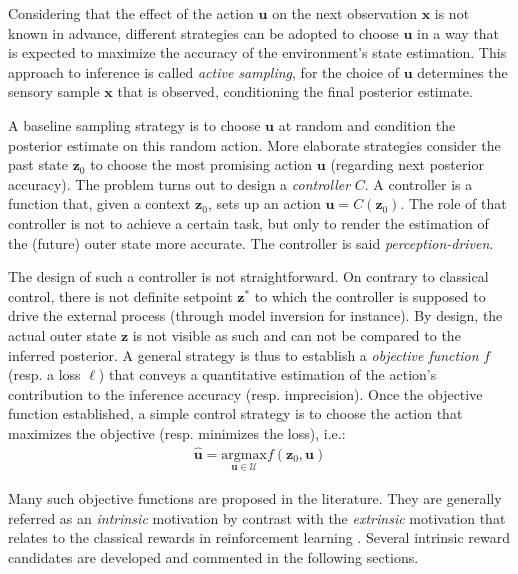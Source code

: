 \documentclass[12pt,twoside,openright]{article}
\begin{document}
Considering that the effect of the action $\boldsymbol{u}$ on the next observation $\boldsymbol{x}$ is not known in advance, different strategies can be adopted to choose $\boldsymbol{u}$ in a way that is expected to maximize the accuracy of the environment's state estimation. This approach to inference is called \emph{active sampling}, for the choice of $\boldsymbol{u}$ determines the sensory sample $\boldsymbol{x}$ that is observed, conditioning the final posterior estimate.

A baseline sampling strategy is to choose $\boldsymbol{u}$ at random and condition the posterior  estimate on this random action. 
More elaborate strategies consider the past state $\boldsymbol{z}_0$ to choose the most promising action $\boldsymbol{u}$ (regarding next posterior accuracy). The problem turns out to design  a \emph{controller} $C$. A controller is a function that, given a context $\boldsymbol{z}_0$, sets up an action $\boldsymbol{u} = C(\boldsymbol{z}_0)$. The role of that controller is not to achieve a certain task, but only to render the estimation of the (future) outer state more accurate. The controller is said \emph{perception-driven}. 

The design of such a controller is not straightforward. On contrary to classical control, there is not definite setpoint $\boldsymbol{z}^*$ to which the controller is supposed to drive the external process (through model inversion for instance). By design, the actual outer state $\boldsymbol{z}$ is not visible as such and can not be compared to the inferred posterior. A general strategy is thus to establish a \emph{objective function} $f$ (resp. a loss $\ell$) that conveys a quantitative estimation of the action's contribution to the inference accuracy (resp. imprecision). Once the objective function established, a simple control strategy is to choose the action that maximizes the objective (resp. minimizes the loss), i.e.:
\begin{align}
\hat{\boldsymbol{u}} = \underset{\boldsymbol{u}\in\mathcal{U}}{\text{argmax}}  f(\boldsymbol{z}_0, \boldsymbol{u})
\end{align}

Many such objective functions are proposed in the literature. They are generally referred as an \emph{intrinsic} motivation by contrast with the \emph{extrinsic} motivation that relates to the classical rewards in reinforcement learning \cite{sutton1998reinforcement}. Several intrinsic reward candidates are developed and commented in the following sections.
\end{document}
